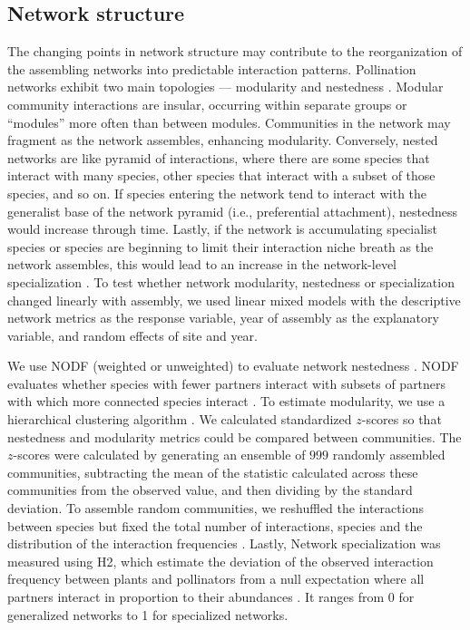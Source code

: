 \documentclass[12pt]{article}
\begin{document}
\subsection*{Network structure}
The changing points in network structure may contribute to the
reorganization of the assembling networks into predictable interaction
patterns. Pollination networks exhibit two main topologies ---
modularity \citep[e.g.,][]{Olesen2007} and nestedness
\citep[e.g.,][]{Bascompte2006, Bascompte2003}. Modular community
interactions are insular, occurring within separate groups or
``modules'' more often than between modules. Communities in the
network may fragment as the network assembles, enhancing
modularity. Conversely, nested networks are like pyramid of
interactions, where there are some species that interact with many
species, other species that interact with a subset of those species,
and so on. If species entering the network tend to interact with the
generalist base of the network pyramid (i.e., preferential
attachment), nestedness would increase through time. Lastly, if the
network is accumulating specialist species or species are beginning to
limit their interaction niche breath as the network assembles, this
would lead to an increase in the network-level specialization
\citep{bluthgen-2006-9}. To test whether network modularity,
nestedness or specialization changed linearly with assembly, we used
linear mixed models with the descriptive network metrics as the
response variable, year of assembly as the explanatory variable, and
random effects of site and year.

We use NODF (weighted or unweighted) to evaluate network nestedness
\citep{nodf}. NODF evaluates whether species with fewer partners
interact with subsets of partners with which more connected species
interact \citep{nodf}. To estimate modularity, we use a hierarchical
clustering algorithm \citep{Newman2004, igraph}.  We calculated
standardized $z$-scores so that nestedness and modularity metrics
could be compared between communities. The $z$-scores were calculated
by generating an ensemble of $999$ randomly assembled communities,
subtracting the mean of the statistic calculated across these
communities from the observed value, and then dividing by the standard
deviation. To assemble random communities, we reshuffled the
interactions between species but fixed the total number of
interactions, species and the distribution of the interaction
frequencies \citep{Galeano2009}. Lastly, Network specialization was
measured using H2, which estimate the deviation of the observed
interaction frequency between plants and pollinators from a null
expectation where all partners interact in proportion to their
abundances \citep{bluthgen-2006-9}. It ranges from 0 for generalized
networks to 1 for specialized networks.
\end{document}
